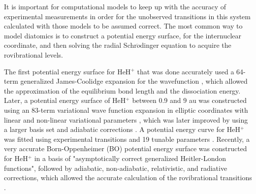 \documentclass[aps,onecolumn]{revtex4}
\begin{document}

It is important for computational models to keep up with the accuracy of experimental
measurements in order for the unobserved transitions in this system calculated with
those models to be assumed correct. The most common way to model diatomics is to construct
a potential energy surface, for the internuclear coordinate, and then solving the radial
Schr$\ddot{o}$dinger equation to acquire the rovibrational levels.

The first potential energy surface for HeH$^+$ that was done accurately used a 64-term
generalized James-Coolidge expansion for the wavefunction \cite{PES7}, which allowed the
approximation of the equilibrium bond length and the dissociation energy. Later, a potential
energy surface of HeH$^+$ between 0.9 and 9 au was constructed using an 83-term variational
wave function expansion in elliptic coordinates with linear and non-linear variational
parameters \cite{PES3, PES4}, which was later improved by using a larger basis set and
adiabatic corrections \cite{PES8}. A potential energy curve for HeH$^+$ was fitted using
experimental transitions and 19 tunable parameters \cite{PES2_exptrans_fit}. Recently,
a very accurate Born-Oppenheimer (BO) potential energy surface was constructed for HeH$^+$
in a basis of "asymptotically correct generalized Heitler-London functions"\cite{PES6},
followed by adiabatic, non-adiabatic, relativistic, and radiative corrections, which allowed
the accurate calculation of the rovibrational transitions \cite{PES5}.
\end{document}
